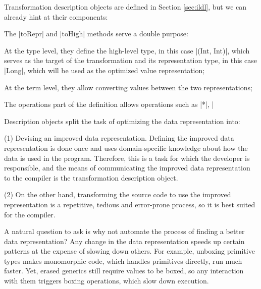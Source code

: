 \noindent
Transformation description objects are defined in Section \ref{sec:ildl}, but we can already hint at their components:
\begin{compactitem}
  \item The |toRepr| and |toHigh| methods serve a double purpose:
  \begin{compactitem}
    \item At the type level, they define the high-level type, in this case |(Int, Int)|, which serves as the target of the transformation and its representation type, in this case |Long|, which will be used as the optimized value representation;
    \item At the term level, they allow converting values between the two representations;
  \end{compactitem}
  \item The operations part of the definition allows operations such as |*|, |%
\end{compactitem}
\vspace{0.5em}

\noindent
Description objects split the task of optimizing the data representation into:
\begin{compactitem}
\item[(1)] Devising an improved data representation. Defining the improved data representation is done once and uses domain-specific knowledge about how the data is used in the program. Therefore, this is a task for which the developer is responsible, and the means of communicating the improved data representation to the compiler is the transformation description object.
\item[(2)] On the other hand, transforming the source code to use the improved representation is a repetitive, tedious and error-prone process, so it is best suited for the compiler.
\end{compactitem}

A natural question to ask is why not automate the process of finding a better data representation? Any change in the data representation speeds up certain patterns at the expense of slowing down others. For example, unboxing primitive types makes monomorphic code, which handles primitives directly, run much faster. Yet, erased generics still require values to be boxed, so any interaction with them triggers boxing operations, which slow down execution. %

